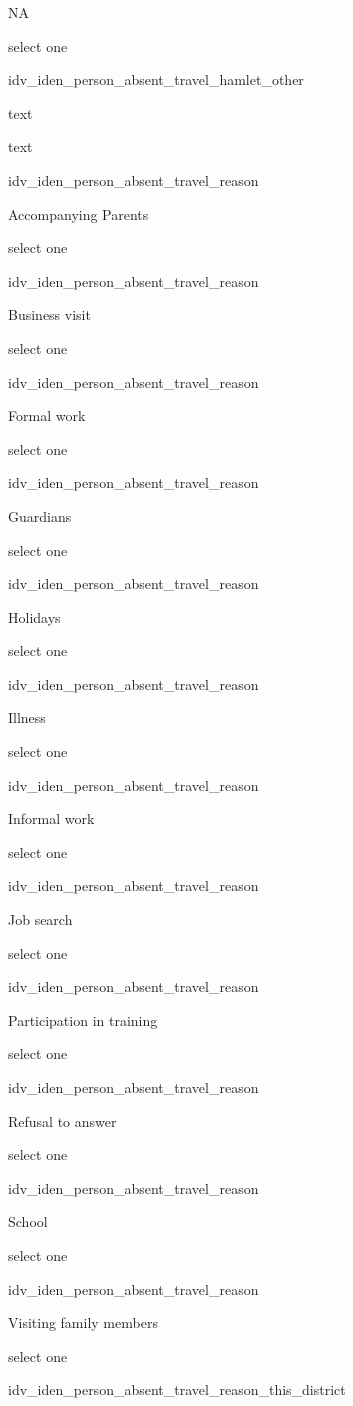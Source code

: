\documentclass[]{article}
\begin{document}
NA

select one

idv\_iden\_person\_absent\_travel\_hamlet\_other

text

text

idv\_iden\_person\_absent\_travel\_reason

Accompanying Parents

select one

idv\_iden\_person\_absent\_travel\_reason

Business visit

select one

idv\_iden\_person\_absent\_travel\_reason

Formal work

select one

idv\_iden\_person\_absent\_travel\_reason

Guardians

select one

idv\_iden\_person\_absent\_travel\_reason

Holidays

select one

idv\_iden\_person\_absent\_travel\_reason

Illness

select one

idv\_iden\_person\_absent\_travel\_reason

Informal work

select one

idv\_iden\_person\_absent\_travel\_reason

Job search

select one

idv\_iden\_person\_absent\_travel\_reason

Participation in training

select one

idv\_iden\_person\_absent\_travel\_reason

Refusal to answer

select one

idv\_iden\_person\_absent\_travel\_reason

School

select one

idv\_iden\_person\_absent\_travel\_reason

Visiting family members

select one

idv\_iden\_person\_absent\_travel\_reason\_this\_district
\end{document}
